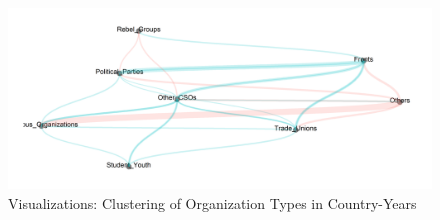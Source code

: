 \begin{figure}[!htpb]
    \centering
    \includegraphics[width = 1\textwidth]{img/arc_network_clusters.png}
    \caption{Visualizations: Clustering of Organization Types in Country-Years}
    \label{Fig: Clusters}
\end{figure}{}

